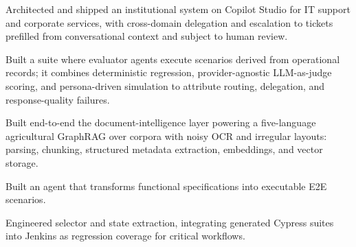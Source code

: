 \documentclass[10pt,a4paper]{article}
\begin{document}


\begin{cvitems}
  \item {} Architected and shipped an institutional system on Copilot Studio
  for IT support and corporate services, with cross-domain delegation and escalation to tickets prefilled from
  conversational context and subject to human review.
  \item {} Built a suite where evaluator agents execute scenarios derived from operational
  records; it combines deterministic regression, provider-agnostic LLM-as-judge scoring, and persona-driven simulation
  to attribute routing, delegation, and response-quality failures.
  \item {} Built end-to-end the document-intelligence layer powering a five-language agricultural
  GraphRAG over corpora with noisy OCR and irregular layouts: parsing, chunking, structured metadata extraction,
  embeddings, and vector storage.
\end{cvitems}

\begin{cvitems}
  \item {} Built an agent that transforms functional specifications into executable E2E
  scenarios.
  \item {} Engineered selector and state extraction, integrating generated Cypress suites into
  Jenkins as regression coverage for critical workflows.
\end{cvitems}

\end{document}
